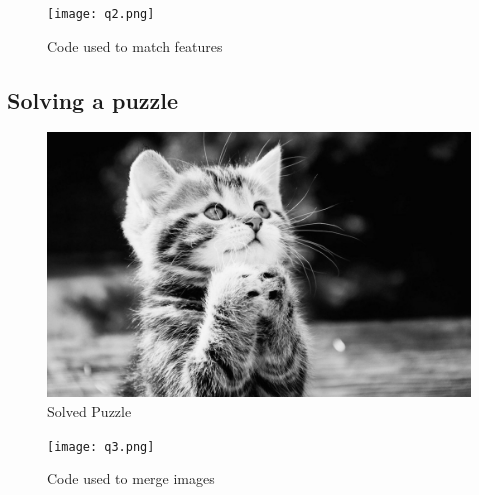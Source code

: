 \documentclass[12pt, letterpaper]{article}
\begin{document}
\begin{figure}[H]
    \centering
    \texttt{[image: q2.png]}
    \caption{Code used to match features}
\end{figure}

\subsection{Solving a puzzle}

\begin{figure}[H]
    \centering
    \includegraphics[width=\textwidth]{out3.png}
    \caption{Solved Puzzle}
\end{figure}

\begin{figure}[H]
    \centering
    \texttt{[image: q3.png]}
    \caption{Code used to merge images}
\end{figure}
\end{document}
